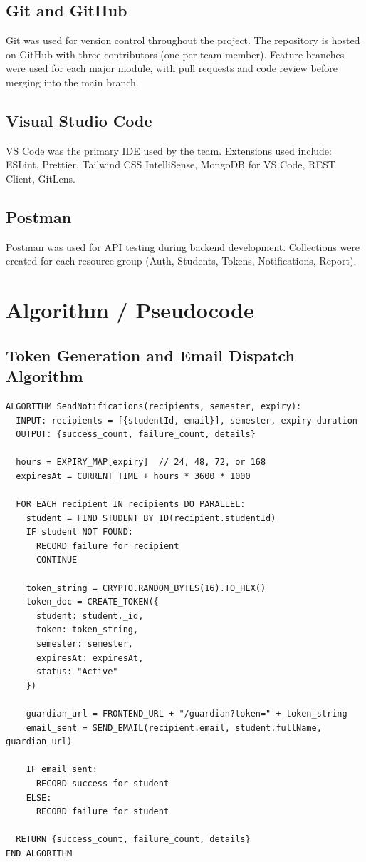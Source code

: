 \documentclass[12pt,a4paper]{report}
\begin{document}
\subsection{Git and GitHub}
Git was used for version control throughout the project. The repository is hosted on GitHub with three contributors (one per team member). Feature branches were used for each major module, with pull requests and code review before merging into the main branch.

\subsection{Visual Studio Code}
VS Code was the primary IDE used by the team. Extensions used include: ESLint, Prettier, Tailwind CSS IntelliSense, MongoDB for VS Code, REST Client, GitLens.

\subsection{Postman}
Postman was used for API testing during backend development. Collections were created for each resource group (Auth, Students, Tokens, Notifications, Report).

\section{Algorithm / Pseudocode}

\subsection{Token Generation and Email Dispatch Algorithm}

\begin{verbatim}
ALGORITHM SendNotifications(recipients, semester, expiry):
  INPUT: recipients = [{studentId, email}], semester, expiry duration
  OUTPUT: {success_count, failure_count, details}

  hours = EXPIRY_MAP[expiry]  // 24, 48, 72, or 168
  expiresAt = CURRENT_TIME + hours * 3600 * 1000

  FOR EACH recipient IN recipients DO PARALLEL:
    student = FIND_STUDENT_BY_ID(recipient.studentId)
    IF student NOT FOUND:
      RECORD failure for recipient
      CONTINUE

    token_string = CRYPTO.RANDOM_BYTES(16).TO_HEX()
    token_doc = CREATE_TOKEN({
      student: student._id,
      token: token_string,
      semester: semester,
      expiresAt: expiresAt,
      status: "Active"
    })

    guardian_url = FRONTEND_URL + "/guardian?token=" + token_string
    email_sent = SEND_EMAIL(recipient.email, student.fullName, guardian_url)

    IF email_sent:
      RECORD success for student
    ELSE:
      RECORD failure for student

  RETURN {success_count, failure_count, details}
END ALGORITHM
\end{verbatim}
\end{document}
